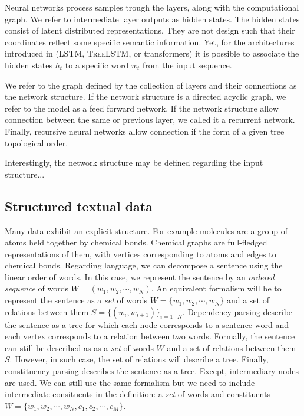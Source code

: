 Neural networks process samples trough the layers, along with the computational graph. We refer to intermediate layer outputs as hidden states. The hidden states consist of latent distributed representations. They are not design such that their coordinates reflect some specific semantic information. Yet, for the architectures introduced in  (\textsc{LSTM}, \textsc{TreeLSTM}, or transformers) it is possible to associate the hidden states $h_t$ to a specific word $w_t$ from the input sequence.

We refer to the graph defined by the collection of layers and their connections as the network structure. If the network structure is a directed acyclic graph, we refer to the model as a feed forward network. If the network structure allow connection between the same or previous layer, we called it a recurrent network. Finally, recursive neural networks allow connection if the form of a given tree topological order. 

Interestingly, the network structure may be defined regarding the input structure...

\subsection{Structured textual data} 

Many data exhibit an explicit structure. For example molecules are a group of atoms held together by chemical bonds. Chemical graphs are full-fledged representations of them, with vertices corresponding to atoms and edges to chemical bonds. Regarding language, we can decompose a sentence using the linear order of words. In this case, we represent the sentence by an \textit{ordered sequence} of words $W = (w_1, w_2, \cdots, w_N)$. An equivalent formalism will be to represent the sentence as a \textit{set} of words $W = \{w_1, w_2, \cdots, w_N\}$ and a set of relations between them $S =\{(w_i, w_{i+1})\}_{i=1 \cdots N}$. Dependency parsing describe the sentence as a tree for which each node corresponds to a sentence word and each vertex corresponds to a relation between two words. Formally, the sentence can still be described as as a \textit{set} of words $W$ and a set of relations between them $S$. However, in such case, the set of relations will describe a tree. Finally, constituency parsing describes the sentence as a tree. Except, intermediary nodes are used. We can still use the same formalism but we need to include intermediate consituents in the definition: a \textit{set} of words and constituents $W = \{w_1, w_2, \cdots, w_N, c_1, c_2, \cdots, c_M\}$.


